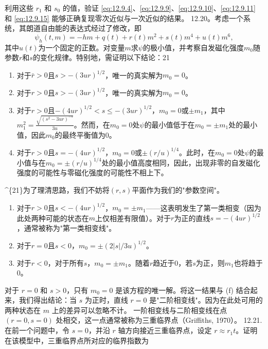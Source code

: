利用这些 \(r_{1}\) 和 \(s_{0}\) 的值，验证 \autoref{eq:12.9.4}、\autoref{eq:12.9.9}、\autoref{eq:12.9.10}、\autoref{eq:12.9.11} 和 \autoref{eq:12.9.15} 能够正确复现零次近似与一次近似的结果。
12.20。考虑一个系统，其朗道自由能的表达式经过了修改，即
\begin{equation}\tag{12.13.44}\label{eq:12.13.44}
\psi _ { h } ( t , m ) = - h m + q ( t ) + r ( t ) m ^{2} + s ( t ) m ^{4} + u ( t ) m ^{6} ,
\end{equation}
其中\(u(t)\)为一个固定的正数。对变量\(m\)求\(\psi\)的极小值，并考察自发磁化强度\(m_0\)随参数\(r\)和\(s\)的变化规律。特别地，需证明以下结论：21
\begin{enumerate}
\def\labelenumi{(\alph{enumi})}
\item
  对于\(\bar{r}>0\)且\(s>-(3ur)^{1/2}\)，唯一的真实解为\(m_0=0\)。
\item
  对于\(r>0\)且\(s>-(3ur)^{1/2}\)，唯一的真实解为\(m_0=0\)。
\item
  对于\(r>0\)且\(-(4ur)^{1/2}<s\leq-(3ur)^{1/2}\)，\(m_0=0\)或\(\pm m_1\)，其中\(m_1^2=\frac{\sqrt{(s^2 - 3ur)^{-s}}}{3u}\)。然而，在\(m_0=0\)处\(\psi\)的最小值低于在\(m_0=\pm m_1\)处的最小值，因此\(m_0\)的最终平衡值为0。
\item
  对于\(r>0\)且\(s=-(4ur)^{1/2}\)，\(m_0=0\)或\(\pm (r/u)^{1/4}\)。此时，在\(m_0=0\)处\(\psi\)的最小值与在\(m_0=\pm (r/u)^{1/4}\)处的最小值高度相同，因此，出现非零的自发磁化强度的可能性与零磁化强度的可能性不相上下。
\end{enumerate}
\^{}\{21\}为了理清思路，我们不妨将\((r,s)\)平面作为我们的"参数空间"。
\begin{enumerate}
\def\labelenumi{(\alph{enumi})}
\setcounter{enumi}{3}
\item
  对于\(r>0\)且\(s<-(4ur)^{1/2}\)，\(m_0=\pm m_1\)——这表明发生了第一类相变（因为此处两种可能的状态在\(m\)上仅相差有限值）。对于\(r\)为正的直线\(s=-(4ur)^{1/2}\)，通常被称为"第一类相变线"。
\item
  对于\(r=0\)且\(s<0\)，\(m_0=\pm(2|s|/3u)^{1/2}\)。
\item
  对于\(r<0\)，对于所有\(s\)，\(m_0=\pm m_1\)。随着\(r\)趋近于0，若\(s\)为正，则\(m_1\)也将趋于0。
\end{enumerate}
对于 \(r = 0\) 和 \(s > 0\)，只有 \(m_0 = 0\) 是该方程的唯一解。将这一结果与 (f) 结合起来，我们得出结论：当 \(s\) 为正时，直线 \(r = 0\) 是"二阶相变线"。因为在此处可用的两种状态在 \(m\) 上的差异可以忽略不计。
一阶相变线与二阶相变线在点 \((r=0, s=0)\) 处相交，这一点通常被称为三重临界点（Griffiths, 1970）。
12.21. 在前一个问题中，令 \(s=0\)，并沿 \(r\) 轴方向接近三重临界点，设定 \(r \approx r_{1}t\)。证明在该模型中，三重临界点所对应的临界指数为
